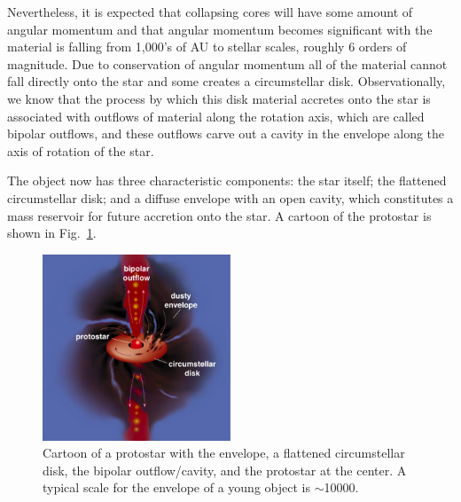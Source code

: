 Nevertheless, it is expected that collapsing cores will have some amount of angular momentum and that angular momentum becomes
significant with the material is falling from 1,000's of AU to stellar scales, roughly 6 orders of magnitude.
Due to conservation of angular momentum all of the material cannot fall directly onto the star and some creates a circumstellar disk.
Observationally, we know that the process by which this disk material accretes onto the star is associated with outflows
of material along the rotation axis, which are called bipolar outflows, and these outflows carve out a cavity in the envelope along the axis of rotation of the star. 

The object now has three characteristic components: the star itself; the flattened circumstellar disk; and a diffuse envelope with an open cavity, which constitutes a mass reservoir for future accretion onto the star. A cartoon of the protostar is shown in Fig.~\ref{fig:Protostar}.

\begin{figure}[!ht]
	\centering
	\includegraphics[width=0.5\textwidth]{Figures/protostar.jpg} 
	\caption[Protostar]{Cartoon of a protostar \citep{Greene:2001dg} with the envelope, a flattened circumstellar disk, the bipolar outflow/cavity, and the protostar at the center. A typical scale for the envelope of a young object is $\sim$\SI{10000}{\au}.}
	\label{fig:Protostar}
    \end{figure}



